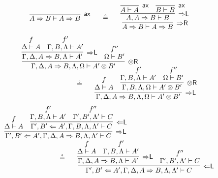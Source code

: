 \documentclass[a4paper,UKenglish,cleveref,autoref,thm-restate, anonymous]{lipics-v2021}
\newcommand{\proofbox}[1]{\begin{array}{c} #1 \end{array}}
\newcommand{\ot}{\otimes}
\newcommand{\Larr}{\Leftarrow}
\newcommand{\Rarr}{\Rightarrow}
\newcommand{\GG}{\Gamma}
\newcommand{\GD}{\Delta}
\newcommand{\GL}{\Lambda}
\newcommand{\GO}{\Omega}
\newcommand{\vd}{\vdash}
\newcommand{\ax}{\mathsf{ax}}
\newcommand{\tr}{{\otimes}\mathsf{R}}
\newcommand{\Ll}{{\Larr}\mathsf{L}}
\newcommand{\Rl}{{\Rarr}\mathsf{L}}
\newcommand{\Rr}{{\Rarr}\mathsf{R}}
\begin{document}
\begin{equation}\label{eq:eta:tr}
\begin{array}{c}
    \proofbox{
    \infer[\ax]{A \Rarr B \vd A \Rarr B}{}
  }
  \quad\circeq\quad
  \proofbox{
    \infer[\Rr]{A \Rarr B \vd A \Rarr B}{
    \infer[\Rl]{A , A \Rarr B \vd B}{
      \infer[\ax]{A \vd A}{}
      &
      \infer[\ax]{B \vd B}{}
    }
  }
  }
\end{array}
\end{equation}
\vspace{-.4cm}
\begin{equation}\label{eq:tr:rl:comm}
  \begin{array}{l}
    \proofbox{\infer[\tr]{\GG , \GD , A \Rarr B , \GL , \GO \vd A' \ot B'}{
    \infer[\Rl]{\GG , \GD , A \Rarr B , \GL \vd A'}{
      \deduce{\GD \vd A}{f}
      &
      \deduce{\GG , B , \GL \vd A'}{f'}
    }
    &
    \deduce{\GO \vd B'}{f''}
  }
  }
  \\[-.2cm]
  \hspace*{3cm}
  \circeq
  \quad
  \proofbox{\infer[\Rl]{\GG , \GD , A \Rarr B , \GL , \GO \vd A' \ot B'}{
    \deduce{\GD \vd A}{f}
    &
    \infer[\tr]{\GG , B , \GL , \GO \vd A' \ot B'}{
      \deduce{\GG , B , \GL \vd A'}{f'}
      &
      \deduce{\GO \vd B'}{f''}
    }
  }
  }
  \end{array}
\end{equation}
\vspace{-.3cm}
\begin{equation}\label{eq:rl:ll:assoc}
  \begin{array}{l}
    \proofbox{
    \infer[\Rl]{\GG' , B' \Larr A' ,  \GG , \GD , A \Rarr B , \GL , \GL' \vd C}{
      \deduce{\GD \vd A}{f}
      &
      \infer[\Ll]{\GG' , B' \Larr A' ,  \GG , B , \GL , \GL' \vd C}{
        \deduce{\GG , B , \GL \vd A'}{f'}
        &
        \deduce{\GG' , B' , \GL' \vd C}{f''}
      }
    }
  }
  \\
  \hspace*{3cm}
  \circeq
  \quad
  \proofbox{
    \infer[\Ll]{\GG' , B' \Larr A' ,  \GG , \GD , A \Rarr B , \GL , \GL' \vd C}{
      \infer[\Rl]{\GG , \GD , A \Rarr B , \GL \vd A'}{
        \deduce{\GD \vd A}{f}
        &
        \deduce{\GG , B , \GL \vd A'}{f'}
      }
      &
      \deduce{\GG' , B' , \GL' \vd C}{f''}
    }
  }
  \end{array}
\end{equation}
\end{document}
